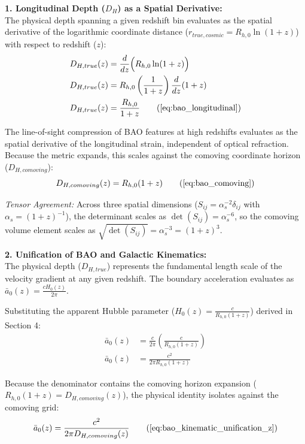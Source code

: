 \textbf{1. Longitudinal Depth ($D_H$) as a Spatial Derivative:} \\
The physical depth spanning a given redshift bin evaluates as the spatial derivative of the logarithmic coordinate distance ($r_{true,cosmic} = R_{h,0} \ln(1+z)$) with respect to redshift ($z$):
\begin{align}
    D_{H,true}(z) &= \frac{d}{dz} \Big(R_{h,0} \ln(1+z)\Big)  \\
    D_{H,true}(z) &= R_{h,0} \left( \frac{1}{1+z} \right) \frac{d}{dz}(1+z) \nonumber \\
    D_{H,true}(z) &= \frac{R_{h,0}}{1+z} \tag{\ref{eq:bao_longitudinal}}
\end{align}

The line-of-sight compression of BAO features at high redshifts evaluates as the spatial derivative of the longitudinal strain, independent of optical refraction. Because the metric expands, this scales against the comoving coordinate horizon ($D_{H,comoving}$):
\begin{equation}
    D_{H,comoving}(z) = R_{h,0}(1+z) \tag{\ref{eq:bao_comoving}}
\end{equation}

\vspace{0.2 cm}

\textit{Tensor Agreement:  }
Across three spatial dimensions ($S_{ij} = \alpha_s^{-2}\delta_{ij}$ with $\alpha_s = (1+z)^{-1}$), the determinant scales as $\det(S_{ij}) = \alpha_s^{-6}$, so the comoving volume element scales as $\sqrt{\det(S_{ij})} = \alpha_s^{-3} = (1+z)^3$.

\vspace{0.2 cm}

\textbf{2. Unification of BAO and Galactic Kinematics:} \\
The physical depth ($D_{H,true}$) represents the fundamental length scale of the velocity gradient at any given redshift. The boundary acceleration evaluates as $\bar{a}_0(z) = \frac{c H_{0}(z)}{2\pi}$.

Substituting the apparent Hubble parameter ($H_{0}(z) = \frac{c}{R_{h,0}(1+z)}$) derived in Section 4: 
\begin{align}
    \bar{a}_0(z) &= \frac{c}{2\pi} \left( \frac{c}{R_{h,0}(1+z)} \right) \nonumber \\
    \bar{a}_0(z) &= \frac{c^2}{2\pi R_{h,0} (1+z)} \label{eq:a0z_corrected}
\end{align}

Because the denominator contains the comoving horizon expansion ($R_{h,0}(1+z) = D_{H,comoving}(z)$), the physical identity isolates against the comoving grid: 
\begin{equation}
    \bar{a}_0(z) = \frac{c^2}{2\pi D_{H,comoving}(z)} \tag{\ref{eq:bao_kinematic_unification_z}}
\end{equation}

